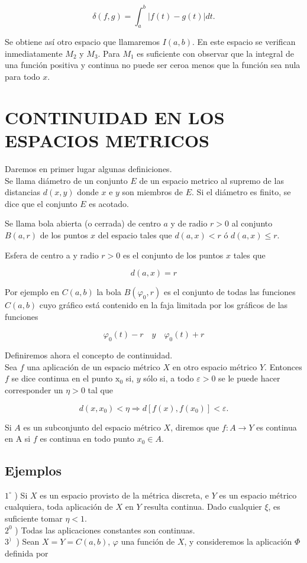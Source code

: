 \documentclass[10pt]{article}
\theoremstyle{plain}
\theoremstyle{definition}
\theoremstyle{remark}
\begin{document}
\begin{equation*}
\delta(f, g)=\int_{a}^{b}|f(t)-g(t)| d t . \tag{$1\cdot3$}
\end{equation*}


Se obtiene así otro espacio que llamaremos $I(a, b)$. En este espacio se verifican inmediatamente $M_{2}$ y $M_{3}$. Para $M_{1}$ es suficiente con observar que la integral de una función positiva y continua no puede ser ceroa menos que la función sea nula para todo $x$.

\section*{CONTINUIDAD EN LOS ESPACIOS METRICOS}
Daremos en primer lugar algunas definiciones.\\
Se llama diámetro de un conjunto $E$ de un espacio metrico al supremo de las distancias $d(x, y)$ donde $x$ e $y$ son miembros de $E$. Si el diámetro es finito, se dice que el conjunto $E$ es acotado.

Se llama bola abierta (o cerrada) de centro $a$ y de radio $r>0$ al conjunto $B(a, r)$ de los puntos $x$ del espacio tales que $d(a, x)<r$ ó $d(a, x) \leqslant r$.

Esfera de centro a y radio $r>0$ es el conjunto de los puntos $x$ tales que

$$
d(a, x)=r
$$

Por ejemplo en $C(a, b)$ la bola $B\left(\varphi_{0}, r\right)$ es el conjunto de todas las funciones $C(a, b)$ cuyo gráfico está contenido en la faja limitada por los gráficos de las funciones

$$
\varphi_{0}(t)-r \quad y \quad \varphi_{0}(t)+r
$$

Definiremos ahora el concepto de continuidad.\\
Sea $f$ una aplicación de un espacio métrico $X$ en otro espacio métrico $Y$. Entonces $f$ se dice continua en el punto $\mathrm{x}_0$ si, $y$ sólo si, a todo $\varepsilon>0$ se le puede hacer corresponder un $\eta>0$ tal que


\begin{equation*}
d\left(x, x_0\right)<\eta \Rightarrow d\left[f(x), f\left(x_{0}\right)\right]<\varepsilon . \tag{1-4}
\end{equation*}


Si $A$ es un subconjunto del espacio métrico $X$, diremos que $f: A \rightarrow Y$ es continua en A si $f$ es continua en todo punto $x_{0} \in A$.

\subsection*{Ejemplos}
$1^{\circ}$ ) Si $X$ es un espacio provisto de la métrica discreta, e $Y$ es un espacio métrico cualquiera, toda aplicación de $X$ en $Y$ resulta continua. Dado cualquier $\xi$, es suficiente tomar $\eta<1$.\\
$2^{0}$ ) Todas las aplicaciones constantes son continuas.\\
$3^{\text {) }}$ ) Sean $X=Y=C(a, b)$, $\varphi$ una función de $X$, y consideremos la aplicación $\Phi$ definida por
\end{document}
